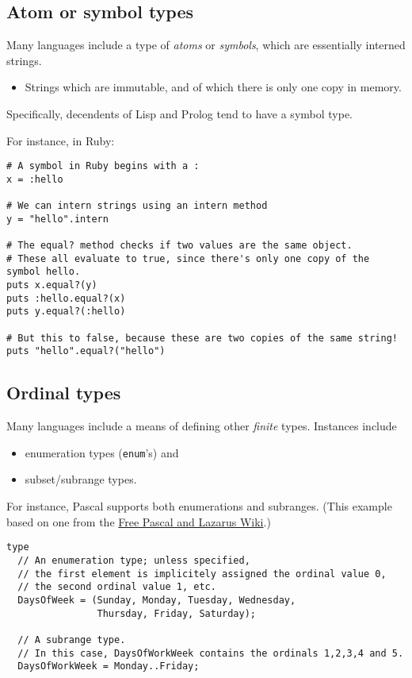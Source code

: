 \documentclass[11pt]{article}
\theoremstyle{definition}
\begin{document}
\subsection{Atom or symbol types}
\label{sec:org1f22ea5}

Many languages include a type of \emph{atoms} or \emph{symbols},
which are essentially interned strings.
\begin{itemize}
\item Strings which are immutable,
and of which there is only one copy in memory.
\end{itemize}

Specifically, decendents of Lisp and Prolog tend to have a symbol type.

For instance, in Ruby:
\begin{verbatim}
# A symbol in Ruby begins with a :
x = :hello

# We can intern strings using an intern method
y = "hello".intern

# The equal? method checks if two values are the same object.
# These all evaluate to true, since there's only one copy of the symbol hello.
puts x.equal?(y)
puts :hello.equal?(x)
puts y.equal?(:hello)

# But this to false, because these are two copies of the same string!
puts "hello".equal?("hello")
\end{verbatim}

\subsection{Ordinal types}
\label{sec:org183d5b7}

Many languages include a means of defining other \emph{finite} types.
Instances include
\begin{itemize}
\item enumeration types (\texttt{enum}'s) and
\item subset/subrange types.
\end{itemize}

For instance, Pascal supports both enumerations
and subranges.
(This example based on one from the \href{https://wiki.freepascal.org/Data\_type}{Free Pascal and Lazarus Wiki}.)
\begin{verbatim}
type
  // An enumeration type; unless specified,
  // the first element is implicitely assigned the ordinal value 0,
  // the second ordinal value 1, etc.
  DaysOfWeek = (Sunday, Monday, Tuesday, Wednesday,
                Thursday, Friday, Saturday);

  // A subrange type.
  // In this case, DaysOfWorkWeek contains the ordinals 1,2,3,4 and 5.
  DaysOfWorkWeek = Monday..Friday;
\end{verbatim}
\end{document}
